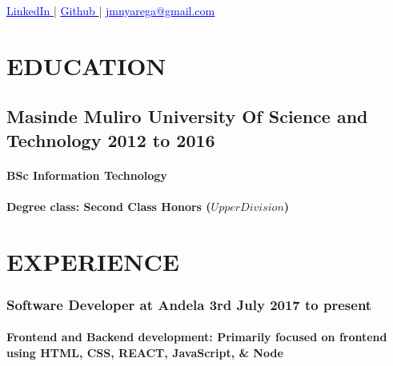\documentclass{article}
\author{Josiah Mokobo Nyarega}
\begin{document}
\renewcommand{\maketitle}{
  \begin{center}
    {
      \huge\bfseries
      \theauthor
    }

    \href{https://www.linkedin.com/in/josiah-nyarega-84820a103}{
      \textcolor{blue}{
        \underline{LinkedIn}
      }
    } |
    \href{https://www.github.com/jmnyarega}{
      \textcolor{blue}{
      \underline{Github}
      }
    } |
    \href{jmnyarega@gmail.com}{
      \textcolor{blue}{
        \underline{jmnyarega@gmail.com}
      }
    }
\end{center}
}
\maketitle


\section{EDUCATION}
\subsection{Masinde Muliro University Of Science and Technology\hspace{130pt} \textbf{2012 to 2016}}
\paragraph{BSc Information Technology}
\paragraph{Degree class: Second Class Honors (\(Upper Division\))}
\section{EXPERIENCE}
\subsubsection{Software Developer at Andela\hspace{190pt} \textbf{3rd July 2017 to present}}
\paragraph{Frontend and Backend development: Primarily focused on frontend using HTML, CSS, REACT, JavaScript, \& Node}
\end{document}
